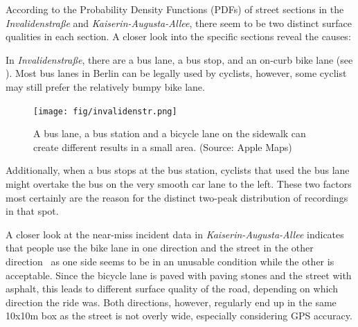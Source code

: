 According to the Probability Density Functions (PDFs) of street sections in the \textit{Invalidenstraße} and \textit{Kaiserin-Augusta-Allee}, there seem to be two distinct surface qualities in each section.
A closer look into the specific sections reveal the causes:
 
\begin{table}%
\centering
\caption{Surface Quality Analysis Evaluation Results Showing Mean, Median and Standard Deviation of Sections With Mixed Results}%
\label{tab:mixed}
\end{table}

In \textit{Invalidenstraße}, there are a bus lane, a bus stop, and an on-curb bike lane (see ).
Most bus lanes in Berlin can be legally used by cyclists, however, some cyclist may still prefer the relatively bumpy bike lane.
\begin{figure}
    \centering
    \texttt{[image: fig/invalidenstr.png]}
    \caption{%
        A bus lane, a bus station and a bicycle lane on the sidewalk can create different results in a small area. (Source: Apple Maps)
    }%
    \label{fig:invaliden}
\end{figure}
Additionally, when a bus stops at the bus station, cyclists that used the bus lane might overtake the bus on the very smooth car lane to the left. 
These two factors most certainly are the reason for the distinct two-peak distribution of recordings in that spot.

A closer look at the near-miss incident data in \textit{Kaiserin-Augusta-Allee} indicates that people use the bike lane in one direction and the street in the other direction~\cite{dataset_simra_set1,dataset_simra_set2,dataset_simra_set3} as one side seems to be in an unusable condition while the other is acceptable.
Since the bicycle lane is paved with paving stones and the street with asphalt, this leads to different surface quality of the road, depending on which direction the ride was.
Both directions, however, regularly end up in the same 10x10m box as the street is not overly wide, especially considering GPS accuracy.

